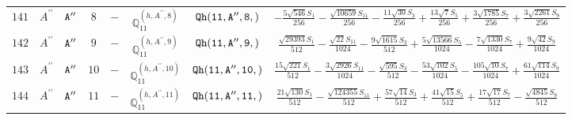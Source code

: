 \documentclass[fleqn,8pt]{jsarticle}
\begin{document}
\begin{table}[ht!]
\begin{center}
\begin{tabular}{cccccccc}
$ 141 $ & $ A^{\prime\prime} $ & $ {\tt A''} $ & $ 8 $ & $ - $ & $ \mathbb{Q}_{11}^{(h,A^{\prime\prime},8)} $ & $ {\tt Qh(11,A'',8,)} $ & $ - \frac{5 \sqrt{546} S_{1}}{256} - \frac{\sqrt{10659} S_{11}}{256} - \frac{11 \sqrt{30} S_{3}}{256} + \frac{13 \sqrt{7} S_{5}}{256} + \frac{3 \sqrt{1785} S_{7}}{256} + \frac{3 \sqrt{2261} S_{9}}{256} $ \\
$ 142 $ & $ A^{\prime\prime} $ & $ {\tt A''} $ & $ 9 $ & $ - $ & $ \mathbb{Q}_{11}^{(h,A^{\prime\prime},9)} $ & $ {\tt Qh(11,A'',9,)} $ & $ \frac{\sqrt{29393} S_{1}}{512} - \frac{\sqrt{22} S_{11}}{1024} - \frac{9 \sqrt{1615} S_{3}}{512} + \frac{5 \sqrt{13566} S_{5}}{1024} - \frac{7 \sqrt{1330} S_{7}}{1024} + \frac{9 \sqrt{42} S_{9}}{1024} $ \\
$ 143 $ & $ A^{\prime\prime} $ & $ {\tt A''} $ & $ 10 $ & $ - $ & $ \mathbb{Q}_{11}^{(h,A^{\prime\prime},10)} $ & $ {\tt Qh(11,A'',10,)} $ & $ \frac{15 \sqrt{221} S_{1}}{512} - \frac{3 \sqrt{2926} S_{11}}{1024} - \frac{\sqrt{595} S_{3}}{512} - \frac{53 \sqrt{102} S_{5}}{1024} - \frac{105 \sqrt{10} S_{7}}{1024} + \frac{61 \sqrt{114} S_{9}}{1024} $ \\
$ 144 $ & $ A^{\prime\prime} $ & $ {\tt A''} $ & $ 11 $ & $ - $ & $ \mathbb{Q}_{11}^{(h,A^{\prime\prime},11)} $ & $ {\tt Qh(11,A'',11,)} $ & $ \frac{21 \sqrt{130} S_{1}}{512} - \frac{\sqrt{124355} S_{11}}{512} + \frac{57 \sqrt{14} S_{3}}{512} + \frac{41 \sqrt{15} S_{5}}{512} + \frac{17 \sqrt{17} S_{7}}{512} - \frac{\sqrt{4845} S_{9}}{512} $ \\
 \hline \hline
\end{tabular}
\end{center}
\end{table}
\end{document}
